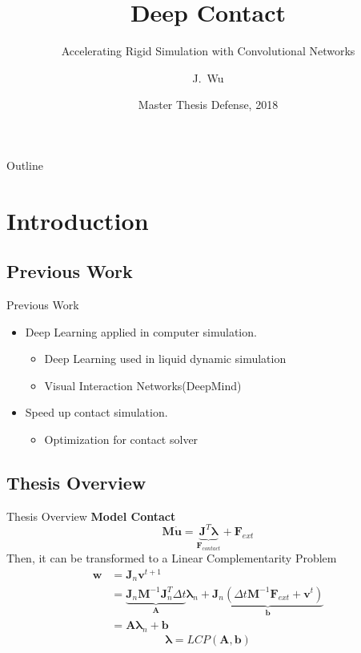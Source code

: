 \documentclass{beamer}
\title{Deep Contact}
\subtitle{Accelerating Rigid Simulation with Convolutional Networks}
\author{J.~Wu}
\institute[University of Copenhagen] %
{
  Department of Computer Science\\
  University of Copenhagen
}
\date{Master Thesis Defense, 2018}
\begin{document}
\begin{frame}
  \titlepage
\end{frame}

\begin{frame}{Outline}
  \tableofcontents
\end{frame}

\section{Introduction}

\subsection{Previous Work}

\begin{frame}{Previous Work}
  \begin{itemize}
  \item {
    Deep Learning applied in computer simulation.
	\begin{itemize}
	\item Deep Learning used in liquid dynamic simulation
        \item Visual Interaction Networks(DeepMind)
	\end{itemize}
  }
  \item {
    Speed up contact simulation.
	\begin{itemize}
	\item Optimization for contact solver
	\end{itemize}
  }
  \end{itemize}
\end{frame}

\subsection{Thesis Overview}
\begin{frame}{Thesis Overview}
\pause
\textbf{Model Contact}
\pause
$$\pmb{M}\dot{\mathbf{u}} = \underbrace{\pmb{J}^{T}\pmb{\lambda}}_{\mathbf{F}_{contact}} + \mathbf{F}_{ext}$$
\pause
Then, it can be transformed to a Linear Complementarity Problem
\pause
\begin{equation*}
    \begin{aligned}
        \mathbf{w} & = \pmb{J}_{n}\mathbf{v}^{t+1} \\
        & =  \underbrace{\pmb{J}_{n}\pmb{M}^{-1}\pmb{J}_{n}^{T}\Delta{t}}_{\pmb{A}}\pmb{\lambda}_{n} + \underbrace{\pmb{J}_{n}(\Delta{t}\pmb{M}^{-1}\mathbf{F}_{ext} + \mathbf{v}^{t})}_{\pmb{b}} \\
        & = \pmb{A}\pmb{\lambda}_{n} + \pmb{b}
    \end{aligned}
\end{equation*}
\pause
$$\pmb{\lambda} = \textit{LCP}(\pmb{A}, \pmb{b})$$
\end{frame}
\end{document}
